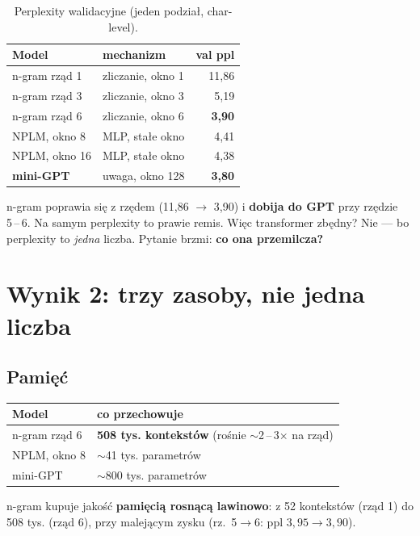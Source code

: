 \documentclass[11pt,a4paper]{article}
\begin{document}
\begin{table}[h]
  \centering
  \caption{Perplexity walidacyjne (jeden podział, char-level).}
  \begin{tabular}{llr}
    \toprule
    Model & mechanizm & val ppl \\
    \midrule
    n-gram rząd 1 & zliczanie, okno 1 & 11,86 \\
    n-gram rząd 3 & zliczanie, okno 3 & 5,19 \\
    n-gram rząd 6 & zliczanie, okno 6 & \textbf{3,90} \\
    NPLM, okno 8 & MLP, stałe okno & 4,41 \\
    NPLM, okno 16 & MLP, stałe okno & 4,38 \\
    \textbf{mini-GPT} & uwaga, okno 128 & \textbf{3,80} \\
    \bottomrule
  \end{tabular}
\end{table}

n-gram poprawia się z rzędem (11,86 $\to$ 3,90) i \textbf{dobija do GPT} przy rzędzie 5\,--\,6. Na samym perplexity to prawie remis. Więc transformer zbędny? Nie --- bo perplexity to \emph{jedna} liczba. Pytanie brzmi: \textbf{co ona przemilcza?}

\section{Wynik 2: trzy zasoby, nie jedna liczba}
\subsection{Pamięć}
\begin{table}[h]
  \centering
  \begin{tabular}{ll}
    \toprule
    Model & co przechowuje \\
    \midrule
    n-gram rząd 6 & \textbf{508 tys. kontekstów} (rośnie $\sim$2\,--\,3$\times$ na rząd) \\
    NPLM, okno 8 & $\sim$41 tys. parametrów \\
    mini-GPT & $\sim$800 tys. parametrów \\
    \bottomrule
  \end{tabular}
\end{table}
n-gram kupuje jakość \textbf{pamięcią rosnącą lawinowo}: z 52 kontekstów (rząd 1) do 508 tys. (rząd 6), przy malejącym zysku (rz.\ 5$\to$6: ppl $3{,}95\to3{,}90$).
\end{document}
